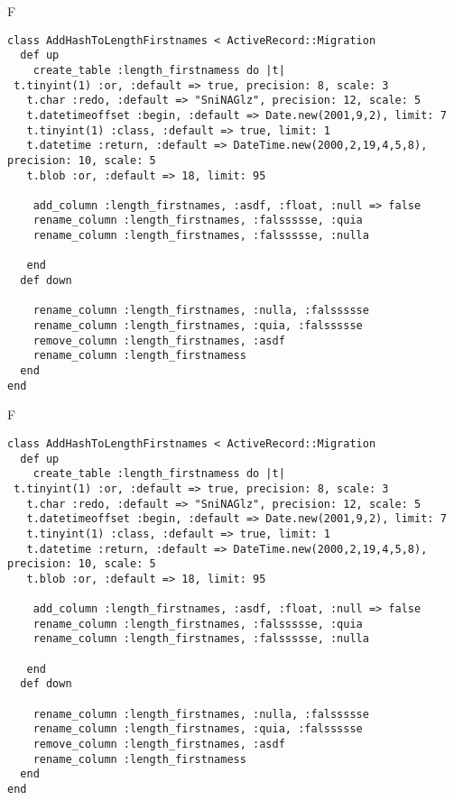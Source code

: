 F
\begin{verbatim}
class AddHashToLengthFirstnames < ActiveRecord::Migration
  def up
    create_table :length_firstnamess do |t| 
 t.tinyint(1) :or, :default => true, precision: 8, scale: 3
   t.char :redo, :default => "SniNAGlz", precision: 12, scale: 5
   t.datetimeoffset :begin, :default => Date.new(2001,9,2), limit: 7
   t.tinyint(1) :class, :default => true, limit: 1
   t.datetime :return, :default => DateTime.new(2000,2,19,4,5,8), precision: 10, scale: 5
   t.blob :or, :default => 18, limit: 95

    add_column :length_firstnames, :asdf, :float, :null => false
    rename_column :length_firstnames, :falssssse, :quia
    rename_column :length_firstnames, :falssssse, :nulla

   end
  def down

    rename_column :length_firstnames, :nulla, :falssssse
    rename_column :length_firstnames, :quia, :falssssse
    remove_column :length_firstnames, :asdf
    rename_column :length_firstnamess
  end
end
\end{verbatim}

F
\begin{verbatim}
class AddHashToLengthFirstnames < ActiveRecord::Migration
  def up
    create_table :length_firstnamess do |t| 
 t.tinyint(1) :or, :default => true, precision: 8, scale: 3
   t.char :redo, :default => "SniNAGlz", precision: 12, scale: 5
   t.datetimeoffset :begin, :default => Date.new(2001,9,2), limit: 7
   t.tinyint(1) :class, :default => true, limit: 1
   t.datetime :return, :default => DateTime.new(2000,2,19,4,5,8), precision: 10, scale: 5
   t.blob :or, :default => 18, limit: 95

    add_column :length_firstnames, :asdf, :float, :null => false
    rename_column :length_firstnames, :falssssse, :quia
    rename_column :length_firstnames, :falssssse, :nulla

   end
  def down

    rename_column :length_firstnames, :nulla, :falssssse
    rename_column :length_firstnames, :quia, :falssssse
    remove_column :length_firstnames, :asdf
    rename_column :length_firstnamess
  end
end
\end{verbatim}

